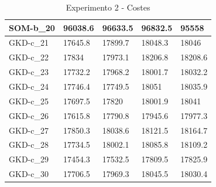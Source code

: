 \documentclass[11pt,a4paper]{article}
\begin{document}
\begin{table}[H]
\begin{tabular}{l|l|l|l|l|}
			\multicolumn{1}{|l|}{SOM-b\_20} & 96038.6 & 96633.5 & 96832.5 & 95558   \\ \hline
			\multicolumn{1}{|l|}{GKD-c\_21} & 17645.8 & 17899.7 & 18048.3 & 18046   \\ \hline
			\multicolumn{1}{|l|}{GKD-c\_22} & 17834   & 17973.1 & 18206.8 & 18208.6 \\ \hline
			\multicolumn{1}{|l|}{GKD-c\_23} & 17732.2 & 17968.2 & 18001.7 & 18032.2 \\ \hline
			\multicolumn{1}{|l|}{GKD-c\_24} & 17746.4 & 17749.5 & 18051   & 18035.9 \\ \hline
			\multicolumn{1}{|l|}{GKD-c\_25} & 17697.5 & 17820   & 18001.9 & 18041   \\ \hline
			\multicolumn{1}{|l|}{GKD-c\_26} & 17615.8 & 17790.8 & 17945.6 & 17977.3 \\ \hline
			\multicolumn{1}{|l|}{GKD-c\_27} & 17850.3 & 18038.6 & 18121.5 & 18164.7 \\ \hline
			\multicolumn{1}{|l|}{GKD-c\_28} & 17734.5 & 18002.1 & 18085.8 & 18109.2 \\ \hline
			\multicolumn{1}{|l|}{GKD-c\_29} & 17454.3 & 17532.5 & 17809.5 & 17825.9 \\ \hline
			\multicolumn{1}{|l|}{GKD-c\_30} & 17706.5 & 17969.3 & 18045.5 & 18030.4 \\ \hline
		\end{tabular}
		\caption{ Experimento 2 - Costes }
		\label{221}
	\end{table}
	
\end{document}
